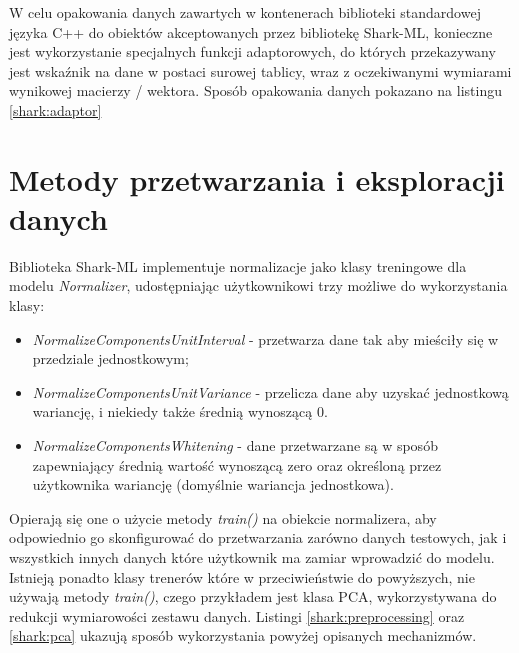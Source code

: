 
W celu opakowania danych zawartych w kontenerach biblioteki standardowej języka C++ do obiektów akceptowanych przez bibliotekę Shark-ML, konieczne jest wykorzystanie specjalnych funkcji adaptorowych, do których przekazywany jest wskaźnik na dane w postaci surowej tablicy, wraz z oczekiwanymi wymiarami wynikowej macierzy / wektora. Sposób opakowania danych pokazano na listingu \ref{shark:adaptor}


\section{Metody przetwarzania i eksploracji danych}

Biblioteka Shark-ML implementuje normalizacje jako klasy treningowe dla modelu \textit{Normalizer}, udostępniając użytkownikowi trzy możliwe do wykorzystania klasy:

\begin{itemize}
	\item \textit{NormalizeComponentsUnitInterval} - przetwarza dane tak aby mieściły się w przedziale jednostkowym;
	\item \textit{NormalizeComponentsUnitVariance} - przelicza dane aby uzyskać jednostkową wariancję, i niekiedy także średnią wynoszącą 0.
	\item \textit{NormalizeComponentsWhitening} - dane przetwarzane są w sposób zapewniający średnią wartość wynoszącą zero oraz określoną przez użytkownika wariancję (domyślnie wariancja jednostkowa).
\end{itemize}

Opierają się one o użycie metody \textit{train()} na obiekcie normalizera, aby odpowiednio go skonfigurować do przetwarzania zarówno danych testowych, jak i wszystkich innych danych które użytkownik ma zamiar wprowadzić do modelu. Istnieją ponadto klasy trenerów które w przeciwieństwie do powyższych, nie używają metody \textit{train()}, czego przykładem jest klasa PCA, wykorzystywana do redukcji wymiarowości zestawu danych. Listingi \ref{shark:preprocessing} oraz \ref{shark:pca} ukazują sposób wykorzystania powyżej opisanych mechanizmów.


